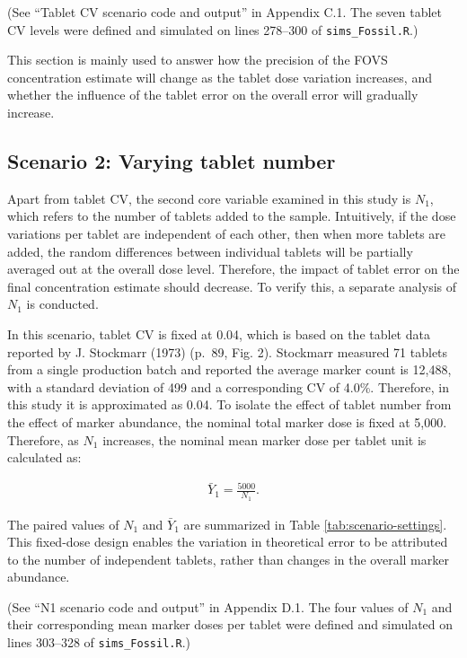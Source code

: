 \documentclass[
  12pt,
]{article}
\begin{document}
(See ``Tablet CV scenario code and output'' in Appendix C.1. The seven
tablet CV levels were defined and simulated on lines 278--300 of
\texttt{sims\_Fossil.R}.)

This section is mainly used to answer how the precision of the FOVS
concentration estimate will change as the tablet dose variation
increases, and whether the influence of the tablet error on the overall
error will gradually increase.

\subsection{Scenario 2: Varying tablet
number}\label{scenario-2-varying-tablet-number}

Apart from tablet CV, the second core variable examined in this study is
\(N_1\), which refers to the number of tablets added to the sample.
Intuitively, if the dose variations per tablet are independent of each
other, then when more tablets are added, the random differences between
individual tablets will be partially averaged out at the overall dose
level. Therefore, the impact of tablet error on the final concentration
estimate should decrease. To verify this, a separate analysis of \(N_1\)
is conducted.

In this scenario, tablet CV is fixed at 0.04, which is based on the
tablet data reported by J. Stockmarr (1973) (p.~89, Fig. 2). Stockmarr
measured 71 tablets from a single production batch and reported the
average marker count is 12,488, with a standard deviation of 499 and a
corresponding CV of 4.0\%. Therefore, in this study it is approximated
as 0.04. To isolate the effect of tablet number from the effect of
marker abundance, the nominal total marker dose is fixed at 5,000.
Therefore, as \(N_1\) increases, the nominal mean marker dose per tablet
unit is calculated as:

\begin{align}
\label{eqn:Ybar1N1} \bar{Y}_1 = \frac{5000}{N_1}.
\end{align}

The paired values of \(N_1\) and \(\bar{Y}_1\) are summarized in Table
\ref{tab:scenario-settings}. This fixed-dose design enables the
variation in theoretical error to be attributed to the number of
independent tablets, rather than changes in the overall marker
abundance.

(See ``N1 scenario code and output'' in Appendix D.1. The four values of
\(N_1\) and their corresponding mean marker doses per tablet were
defined and simulated on lines 303--328 of \texttt{sims\_Fossil.R}.)
\end{document}
